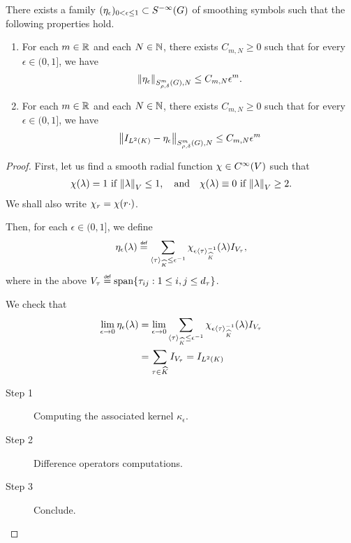 \begin{corollary}
    There exists a family $(\eta_\epsilon)_{0 < \epsilon \leq 1} \subset \SmoothingSymbols$ of smoothing symbols
    such that the following properties hold.
    \begin{enumerate}
        \item For each $m \in \R$ and each $N \in \N$,
            there exists $C_{m, N} \geq 0$ such that for every $\epsilon \in (0, 1]$,
            we have
            \begin{align*}
                \SymbolSemiNorm m {\rho, \delta} N {\eta_\epsilon} \leq C_{m, N} \epsilon^m.
            \end{align*}
        \item For each $m \in \R$ and each $N \in \N$,
            there exists $C_{m, N} \geq 0$ such that for every $\epsilon \in (0, 1]$,
            we have
            \begin{align*}
                \SymbolSemiNorm m {\rho, \delta} N {\Id {\Lebesgue 2 \CompactGroup} - \eta_\epsilon} \leq C_{m, N} \epsilon^m
            \end{align*}
    \end{enumerate}
\end{corollary}
\begin{proof}
    First, let us find a smooth radial function $\chi \in \SmoothFunctions \VectorSpace$ such that
    \begin{align*}
        \chi(\lambda) = 1 \  \text{if}\  \norm[\VectorSpace]{\lambda} \leq 1, \quad \text{and} \quad
        \chi(\lambda) \equiv 0 \ \text{if}\  \norm[\VectorSpace]{\lambda} \geq 2.
    \end{align*}
    We shall also write $\chi_r = \chi(r \dummy)$.

    Then, for each $\epsilon \in (0, 1]$,
    we define
    \begin{align*}
        \eta_\epsilon(\lambda)
        \defeq \sum_{\JapaneseBracket \CompactGroup \tau \leq \epsilon^{-1}} \chi_{\epsilon \JapaneseBracket \CompactGroup \tau^{-1}}(\lambda) \Id {V_\tau},
    \end{align*}
    where in the above $V_\tau \defeq \Span \{\tau_{ij} : 1 \leq i, j \leq \dimRep \tau\}$.

    We check that
    \begin{align*}
        \lim_{\epsilon \to 0} \eta_\epsilon(\lambda)
        &= \lim_{\epsilon \to 0} \sum_{\JapaneseBracket \CompactGroup \tau \leq \epsilon^{-1}} \chi_{\epsilon \JapaneseBracket \CompactGroup \tau^{-1}} (\lambda) \Id {V_\tau}\\
        &= \sum_{\tau \in \dualGroup \CompactGroup} \Id {V_\tau}
        = \Id {\Lebesgue 2 \CompactGroup}
    \end{align*}

    \begin{description}
        \item [Step 1] Computing the associated kernel $\kappa_\epsilon$.
        \item [Step 2] Difference operators computations.
        \item [Step 3] Conclude.
    \end{description}
\end{proof}

